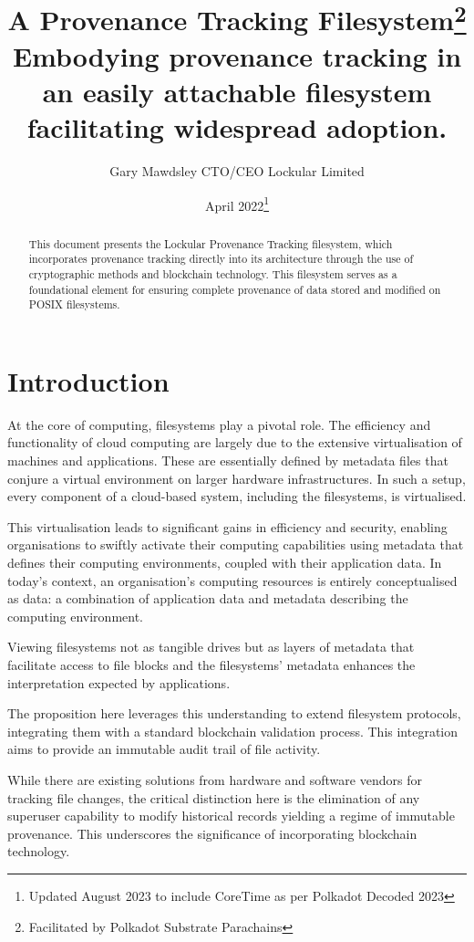 \documentclass{tufte-handout}
\title{A Provenance Tracking Filesystem\thanks{Facilitated by Polkadot Substrate Parachains} \\
\large Embodying provenance tracking in an easily attachable filesystem facilitating widespread adoption.}
\author[Gary Mawdsley]{Gary Mawdsley CTO/CEO Lockular Limited}
\date{April 2022\thanks{Updated August 2023 to include CoreTime as per Polkadot Decoded 2023}}  %
\begin{document}
\maketitle

\begin{abstract}
  This document presents the Lockular Provenance Tracking filesystem, which incorporates provenance tracking directly into
  its architecture through the use of cryptographic methods and blockchain technology. This filesystem serves as a
  foundational element for ensuring complete provenance of data stored and modified on POSIX filesystems.
  \end{abstract}


\section{Introduction}
At the core of computing, filesystems play a pivotal role. The efficiency and functionality of cloud computing are largely due to the extensive virtualisation of
machines and applications. These are essentially defined by metadata files that conjure a virtual environment on larger hardware infrastructures. In such a setup,
every component of a cloud-based system, including the filesystems, is virtualised.

This virtualisation leads to significant gains in efficiency and security, enabling organisations to swiftly activate their computing capabilities using metadata
that defines their computing environments, coupled with their application data. In today's context, an organisation's computing resources is entirely
conceptualised as data: a combination of application data and metadata describing the computing environment.

Viewing filesystems not as tangible drives but as layers of metadata that facilitate access to file blocks and the filesystems' metadata enhances the interpretation
expected by applications.

The proposition here leverages this understanding to extend filesystem protocols, integrating them with a standard blockchain validation process. This integration
aims to provide an immutable audit trail of file activity.

While there are existing solutions from hardware and software vendors for tracking file changes, the critical distinction here is the elimination of any superuser
capability to modify historical records yielding a regime of immutable provenance. This underscores the significance of incorporating blockchain technology.
\end{document}
